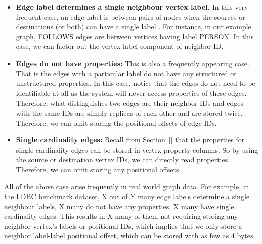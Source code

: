 \begin{itemize}
	\item \textbf{Edge label determines a single neighbour vertex label.} In this very frequent case, an edge label is between pairs of nodes when the sources or destinations (or both) can have a single label . For instance, in our example graph, FOLLOWS edges are between vertices having label PERSON. In this case, we can factor out the vertex label component of neighbor ID.
		
	\item \textbf{Edges do not have properties:} This is also a frequently appearing case. That is the edges with a particular label do not have any structured or unstructured properties. In this case, notice that the edges do not need to be identifiable at all as the system will never access properties of these edges. Therefore, what distinguishes two edges are their neighbor IDs and edges with the same IDs are simply replicas of each other and are stored twice. Therefore, we can omit storing the positional offsets of edge IDs.
	
	\item \textbf{Single cardinality edges:} Recall from Section~\ref{} that the properties for single cardinality edges can be stored in vertex property columns. So by using the source or destination vertex IDs, we can directly read properties. Therefore, we can omit storing any positional offsets. 
		
\end{itemize}
All of the above case arise frequently in real world graph data. For example, in the LDBC benchmark dataset, X  out of Y many edge labels determine a single neighbour labels, X many do not have any properties, X many have single cardinality edges. This results in X many of them not requiring storing any neighbor vertex's labels or positional IDs, which implies that we only store a neighbor label-label positional offset, which can be stored with as few as 4 bytes.  

